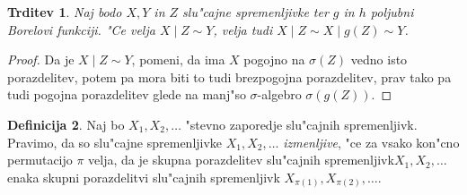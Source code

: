 \documentclass[12pt, a4paper, reqno]{amsart}
\theoremstyle{definition}
\newtheorem{definicija}{Definicija}[section]
\theoremstyle{plain}
\newtheorem{trditev}[definicija]{Trditev}
\newcommand{\Prob}{\mathbb{P}}
\newcommand{\1}{\mathds{1}}
\begin{document}

%

    \begin{trditev}
        Naj bodo $X, Y$ in $Z$ slu"cajne spremenljivke ter $g$ in $h$ poljubni Borelovi funkciji. 
        "Ce velja $X\mid Z\sim Y$, velja tudi $X\mid Z\sim X\mid g(Z)\sim Y$.
        \label{trd:pogojneLastnosti}
    \end{trditev}

    \begin{proof}
        Da je $X\mid Z\sim Y$, pomeni, da ima $X$ pogojno na $\sigma(Z)$ vedno isto porazdelitev, potem pa mora
        biti to tudi brezpogojna porazdelitev, prav tako pa tudi pogojna porazdelitev glede
        na manj"so $\sigma$-algebro $\sigma(g(Z))$.
    \end{proof}

    \begin{definicija}
        Naj bo $X_1, X_2, \dots$ "stevno zaporedje slu"cajnih spremenljivk. Pravimo, da 
        so slu"cajne spremenljivke $X_1, X_2, \dots$ \textit{izmenljive}, "ce za vsako kon"cno 
        permutacijo $\pi$ velja, da je skupna porazdelitev slu"cajnih spremenljivk\newline $X_1, X_2, \dots$ enaka
        skupni porazdelitvi slu"cajnih spremenljivk $X_{\pi(1)}, X_{\pi(2)}, \dots$.
        \label{def:Izmenljivost}
    \end{definicija}
\end{document}
